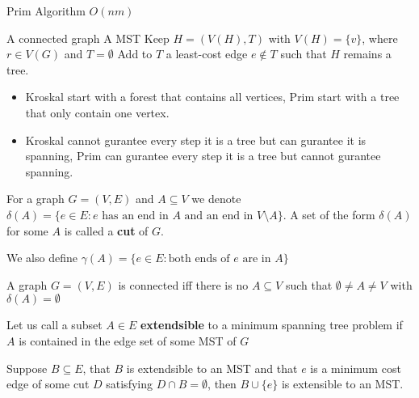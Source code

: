 			\begin{algorithm}
				\caption{Prim Algorithm $O(nm)$}
				\begin{algorithmic}
					\REQUIRE A connected graph
					\ENSURE A MST
					\STATE Keep $H = (V(H), T)$ with $V(H) = \{v\}$, where $r\in V(G)$ and $T=\emptyset$
						\STATE Add to $T$ a least-cost edge $e \notin T$ such that $H$ remains a tree.
					\ENDWHILE
				\end{algorithmic}
			\end{algorithm}

			\begin{itemize}
				\item Kroskal start with a forest that contains all vertices, Prim start with a tree that only contain one vertex.
				\item Kroskal cannot gurantee every step it is a tree but can gurantee it is spanning, Prim can gurantee every step it is a tree but cannot gurantee spanning.
			\end{itemize}

			\begin{definition}[cut]
				For a graph $G=(V, E)$ and $A \subseteq V$ we denote $\delta(A) = \{e \in E :\text{$e$ has an end in $A$ and an end in $V\setminus A$}\}$. A set of the form $\delta(A)$ for some $A$ is called a \textbf{cut} of $G$.
			\end{definition}
			\begin{definition}
				We also define $\gamma(A) = \{e\in E: \text{both ends of $e$ are in $A$}\}$				
			\end{definition}

			\begin{theorem}
				A graph $G=(V, E)$ is connected iff there is no $A\subseteq V$ such that $\emptyset \ne A \ne V$ with $\delta(A) = \emptyset$
			\end{theorem}

			\begin{definition}
				Let us call a subset $A \in E$ \textbf{extendsible} to a minimum spanning tree problem if $A$ is contained in the edge set of some MST of $G$
			\end{definition}

			\begin{theorem}
				Suppose $B \subseteq E$, that $B$ is extendsible to an MST and that $e$ is a minimum cost edge of some cut $D$ satisfying $D\cap B = \emptyset$, then $B\cup \{e\}$ is extensible to an MST.
			\end{theorem}

